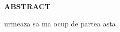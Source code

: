 	\thispagestyle{empty}
	\begin{center}
		\bf{ABSTRACT}
	\end{center}
	
	
	urmeaza sa ma ocup de partea asta 
